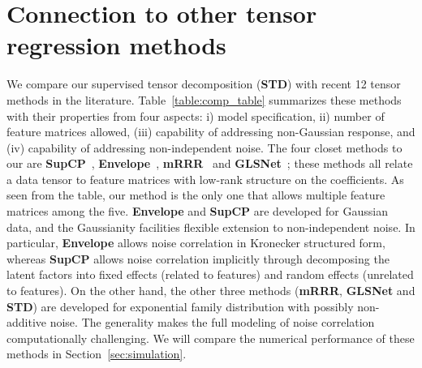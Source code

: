 \documentclass[12pt]{article}
\theoremstyle{definition}
\theoremstyle{definition}
\begin{document}
\section{Connection to other tensor regression methods}\label{sec:connection}
{  We compare our supervised tensor decomposition (\textbf{STD}) with recent 12 tensor methods in the literature. Table~\ref{table:comp_table} summarizes these methods with their properties from four aspects: i) model specification, ii) number of feature matrices allowed, (iii) capability of addressing non-Gaussian response, and (iv) capability of addressing non-independent noise. The four closet methods to our are {\bf SupCP}~\citep{lock2018supervised}, {\bf Envelope}~\citep{li2017parsimonious}, {\bf mRRR}~\citep{luo2018leveraging} and {\bf GLSNet}~\citep{zhang2018network}; these methods all relate a data tensor to feature matrices with low-rank structure on the coefficients. As seen from the table, our method is the only one that allows multiple feature matrices among the five. {\bf Envelope} and {\bf SupCP} are developed for Gaussian data, and the Gaussianity facilities flexible extension to non-independent noise. In particular, {\bf Envelope} allows noise correlation in Kronecker structured form, whereas {\bf SupCP} allows noise correlation implicitly through decomposing the latent factors into fixed effects (related to features) and random effects (unrelated to features). On the other hand, the other three methods ({\bf mRRR}, {\bf GLSNet} and {\bf STD}) are developed for exponential family distribution with possibly non-additive noise. The generality makes the full modeling of noise correlation computationally challenging. We will compare the numerical performance of these methods in Section~\ref{sec:simulation}.

\afterpage{
\begin{landscape}
 \renewcommand{\arraystretch}{1.5} %
\begin{table}[h!]
\centering
  

\end{table}
\end{landscape}}}
\end{document}
